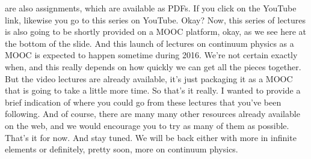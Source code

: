 \documentclass[10pt]{article}
\begin{document}
are also assignments, which are available as PDFs. If you click on the YouTube link, likewise you go to this series on YouTube. Okay? Now, this series of lectures is also going to be shortly provided on a MOOC platform, okay, as we see here at the bottom of the slide. And this launch of lectures on continuum physics as a MOOC is expected to happen sometime during 2016. We're not certain exactly when, and this really depends on how quickly we can get all the pieces together. But the video lectures are already available, it's just packaging it as a MOOC that is going to take a little more time. So that's it really. I wanted to provide a brief indication of where you could go from these lectures that you've been following. And of course, there are many many other resources already available on the web, and we would encourage you to try as many of them as possible. That's it for now. And stay tuned. We will be back either with more in infinite elements or definitely, pretty soon, more on continuum physics.
\end{document}
